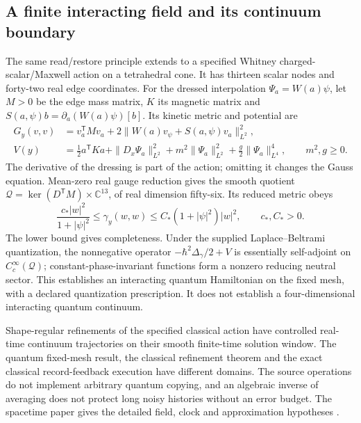 \documentclass[11pt]{article}
\begin{document}
\subsection{A finite interacting field and its continuum boundary}
The same read/restore principle extends to a specified Whitney
charged-scalar/Maxwell action on a tetrahedral cone. It has thirteen scalar
nodes and forty-two real edge coordinates. For the dressed interpolation
$\Psi_a=W(a)\psi$, let $M>0$ be the edge mass matrix, $K$ its magnetic
matrix and $S(a,\psi)b=\partial_a(W(a)\psi)[b]$. Its kinetic metric and
potential are
\begin{align*}
 G_y(v,v)&=v_a^{\mathsf T}Mv_a+
 2\|W(a)v_\psi+S(a,\psi)v_a\|_{L^2}^2,\\
 V(y)&=\tfrac12a^{\mathsf T}Ka+\|D_x\Psi_a\|_{L^2}^2
       +m^2\|\Psi_a\|_{L^2}^2+\tfrac g2\|\Psi_a\|_{L^4}^4,
 \qquad m^2,g\geq0.
\end{align*}
The derivative of the dressing is part of the action; omitting it changes
the Gauss equation. Mean-zero real gauge reduction gives the smooth quotient
$\mathcal Q=\ker(D^{\mathsf T}M)\times\mathbb C^{13}$, of real dimension
fifty-six. Its reduced metric obeys
\[
 \frac{c_*|w|^2}{1+|\psi|^2}\leq\gamma_y(w,w)
 \leq C_*(1+|\psi|^2)|w|^2,
 \qquad c_*,C_*>0.
\]
The lower bound gives completeness. Under the supplied Laplace--Beltrami
quantization, the nonnegative operator
$-\hbar^2\Delta_\gamma/2+V$ is essentially self-adjoint on
$C_c^\infty(\mathcal Q)$; constant-phase-invariant functions form a nonzero
reducing neutral sector. This establishes an interacting quantum
Hamiltonian on the fixed mesh, with a declared quantization prescription.
It does not establish a four-dimensional interacting quantum continuum.

Shape-regular refinements of the specified classical action have controlled
real-time continuum trajectories on their smooth finite-time solution
window. The quantum fixed-mesh result, the classical refinement theorem and
the exact classical record-feedback execution have different domains.
The source operations do not implement arbitrary quantum copying, and
an algebraic inverse of averaging does not protect long noisy histories
without an error budget. The spacetime paper gives the detailed field,
clock and approximation hypotheses \cite{ophEinstein}.


\end{document}
